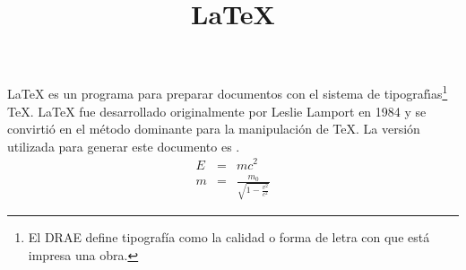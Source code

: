 \documentclass[12pt]{article}
\title{\LaTeX}
\date{}
\begin{document}
  \maketitle \LaTeX{} es un programa para preparar documentos con 
  el sistema de tipograf\'{\i}as\footnote{%
    El DRAE define tipograf\'ia como la calidad o forma de letra con que está impresa una obra.
  } %
  \TeX{}. \LaTeX{} fue desarrollado originalmente por Leslie Lamport 
  en 1984 y se convirti\'o en el m\'etodo dominante para la 
  manipulaci\'on de \TeX. La versi\'on utilizada para generar 
  este documento es \LaTeXe.
  \newline
  \begin{align}
    E &=& mc^2                              \\
    m &=& \frac{m_0}{\sqrt{1-\frac{v^2}{c^2}}}
  \end{align}
\end{document}
